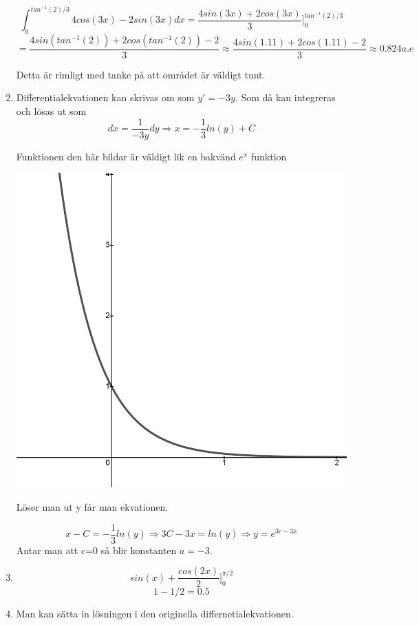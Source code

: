 \documentclass[a4paper,12pt]{article}
\begin{document}
\begin{enumerate}
    $$\int_0^{tan^{-1}(2)/3}4cos(3x)-2sin(3x)dx=\frac{4sin(3x)+2cos(3x)}{3}]^{tan^{-1}(2)/3}_0$$
    $$=\frac{4sin(tan^{-1}(2))+2cos(tan^{-1}(2))-2}{3}\approx \frac{4sin(1.11)+2cos(1.11)-2}{3}\approx 0.824 a.e$$

    Detta är rimligt med tanke på att området är väldigt tunt.

    \item Differentialekvationen kan skrivas om som $y'=-3y$. Som då kan integreras och lösas ut som
    $${dx}=\frac{1}{-3y}dy\Rightarrow x=-\frac{1}{3}ln(y)+C$$

    Funktionen den här bildar är väldigt lik en bakvänd $e^x$ funktion
    \begin{center}
        \includegraphics[scale=0.4]{Figur 5.png}
    \end{center}

    Löser man ut y får man ekvationen.

    $$x-C=-\frac{1}{3}ln(y)\Rightarrow 3C-3x=ln(y)\Rightarrow y=e^{3c-3x}$$
    Antar man att c=0 så blir konstanten $a=-3$.

    \item 

    $$sin(x) + \frac{cos(2x)}{2}]_0^{\pi/2}$$
    $$1-1/2=0.5$$

    \item Man kan sätta in lösningen i den originella differnetialekvationen.
    

\end{enumerate}
\end{document}
